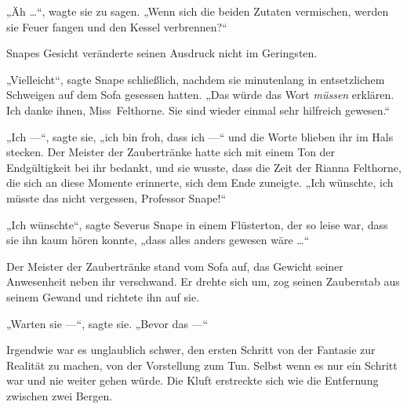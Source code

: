 „Äh …“, wagte sie zu sagen.
„Wenn sich die beiden Zutaten vermischen, werden sie Feuer fangen und den Kessel verbrennen?“

Snapes Gesicht veränderte seinen Ausdruck nicht im Geringsten.

„Vielleicht“, sagte Snape schließlich, nachdem sie minutenlang in entsetzlichem Schweigen auf dem Sofa gesessen hatten.
„Das würde das Wort \emph{müssen} erklären. Ich danke ihnen, Miss~Felthorne. Sie sind wieder einmal sehr hilfreich gewesen.“

„Ich —“, sagte sie, „ich bin froh, dass ich —“ und die Worte blieben ihr im Hals stecken. Der Meister der Zaubertränke hatte sich mit einem Ton der Endgültigkeit bei ihr bedankt, und sie wusste, dass die Zeit der Rianna Felthorne, die sich an diese Momente erinnerte, sich dem Ende zuneigte.
„Ich wünschte, ich müsste das nicht vergessen, Professor Snape!“

„Ich wünschte“, sagte Severus Snape in einem Flüsterton, der so leise war, dass sie ihn kaum hören konnte, „dass alles anders gewesen wäre …“

Der Meister der Zaubertränke stand vom Sofa auf, das Gewicht seiner Anwesenheit neben ihr verschwand. Er drehte sich um, zog seinen Zauberstab aus seinem Gewand und richtete ihn auf sie.

„Warten sie —“, sagte sie.
„Bevor das —“

Irgendwie war es unglaublich schwer, den ersten Schritt von der Fantasie zur Realität zu machen, von der Vorstellung zum Tun. Selbst wenn es nur ein Schritt war und nie weiter gehen würde. Die Kluft erstreckte sich wie die Entfernung zwischen zwei Bergen.

